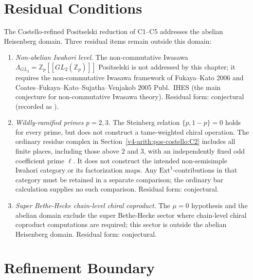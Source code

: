\section{Residual Conditions}
\label{v4-arith:pos-costello:residual}

The Costello-refined Positselski reduction of C1--C5 addresses the
abelian Heisenberg domain. Three residual items remain outside
this domain:
\begin{enumerate}
\item \emph{Non-abelian Iwahori level.} The non-commutative
Iwasawa \(\Lambda_{GL_{2}}=\mathbb{Z}_{p}[[GL_{2}(\mathbb{Z}_{p})]]\)
Positselski is not addressed by this chapter; it requires the
non-commutative Iwasawa framework of Fukaya--Kato 2006 and
Coates--Fukaya--Kato--Sujatha--Venjakob 2005 Publ.~IHES (the main
conjecture for non-commutative Iwasawa theory). Residual form:
conjectural (recorded as ).
\item \emph{Wildly-ramified primes \(p=2,3\).} The Steinberg
relation \(\{p,1-p\}=0\) holds for every prime, but does not
construct a tame-weighted chiral operation. The ordinary residue
complex in Section~\ref{v4-arith:pos-costello:C2} includes all finite
places, including those above \(2\) and \(3\), with an independently
fixed odd coefficient prime \(\ell\). It does not construct the
intended non-semisimple Iwahori category or its factorization maps.
Any \(\mathrm{Ext}^1\)-contributions in that category must be
retained in a separate comparison; the ordinary bar calculation
supplies no such comparison. Residual form: conjectural.
\item \emph{Super Bethe-Hecke chain-level chiral coproduct.} The
\(\mu=0\) hypothesis and the abelian domain exclude the
super Bethe-Hecke sector where chain-level chiral coproduct
computations are required; this sector is outside the abelian
Heisenberg domain. Residual form: conjectural.
\end{enumerate}

\section{Refinement Boundary}
\label{v4-arith:pos-costello:summary}

